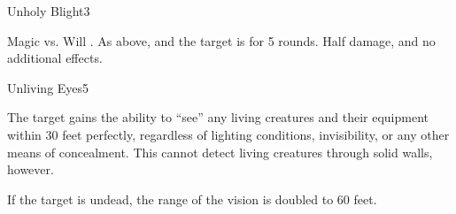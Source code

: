 \begin{spellsection}{Unholy Blight}{3}
    \begin{spellheader}
    \end{spellheader}
    \begin{spellcontent}
        \begin{spelltargetinginfo}
        \end{spelltargetinginfo}
        \begin{spelleffects}
            \begin{spellattack}{Magic vs. Will}
                \spellsuccess {}.
                \spellcritical As above, and the target is \staggered for 5 rounds.
                \spellfailure Half damage, and no additional effects.
            \end{spellattack}
        \end{spelleffects}
    \end{spellcontent}
    \begin{spellfooter}
        \miscastrandom
    \end{spellfooter}
\end{spellsection}

\begin{spellsection}{Unliving Eyes}{5}
    \begin{spellheader}
    \end{spellheader}
    \begin{spellcontent}
        \begin{spelltargetinginfo}
        \end{spelltargetinginfo}
        \begin{spelleffects}
            \spelleffect The target gains the ability to ``see'' any living creatures and their equipment within 30 feet perfectly, regardless of lighting conditions, invisibility, or any other means of concealment. This cannot detect living creatures through solid walls, however.

            If the target is undead, the range of the vision is doubled to 60 feet.
            \spelldur \durpersonallong
        \end{spelleffects}
    \end{spellcontent}
    \begin{spellfooter}
        \miscastexplode
    \end{spellfooter}
\end{spellsection}

